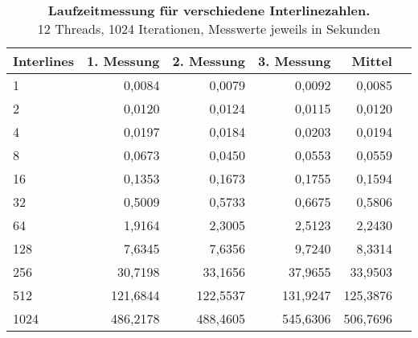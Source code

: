 \documentclass[a4paper,12pt]{scrartcl}
\begin{document}
\begin{table}[!h]
\begin{tabular}{|l|r|r|r|r|r|}
\hline
Interlines&1. Messung&2. Messung&3. Messung&Mittel\\
\hline
1&	0,0084	&0,0079	&0,0092	&0,0085\\
\hline
2&	0,0120	&0,0124	&0,0115	&0,0120\\
\hline
4&	0,0197	&0,0184	&0,0203	&0,0194\\
\hline
8&	0,0673	&0,0450	&0,0553	&0,0559\\
\hline
16&	0,1353	&0,1673	&0,1755	&0,1594\\
\hline
32&	0,5009	&0,5733	&0,6675	&0,5806\\
\hline
64&	1,9164	&2,3005	&2,5123	&2,2430\\
\hline
128&	7,6345	&7,6356	&9,7240	&8,3314\\
\hline
256&	30,7198	&33,1656	&37,9655	&33,9503\\
\hline
512&	121,6844	&122,5537	&131,9247	&125,3876\\
\hline
1024&	486,2178	&488,4605	&545,6306	&506,7696\\

\hline
\end{tabular}
\caption{\textbf{Laufzeitmessung für verschiedene Interlinezahlen.} \\12 Threads, 1024 Iterationen, Messwerte jeweils in Sekunden}
\end{table}
\end{document}
